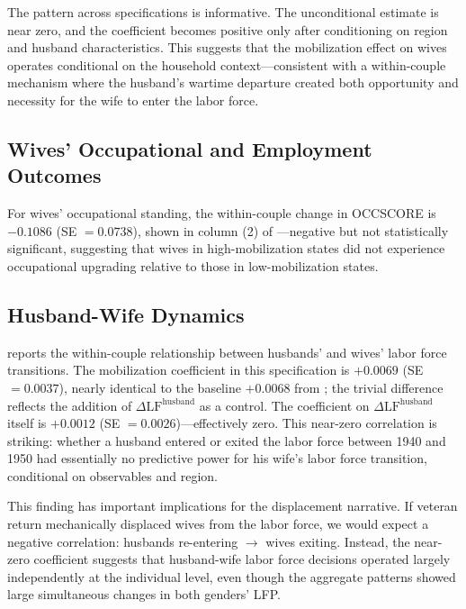 \documentclass[12pt]{article}
\begin{document}
The pattern across specifications is informative. The unconditional estimate is near zero, and the coefficient becomes positive only after conditioning on region and husband characteristics. This suggests that the mobilization effect on wives operates conditional on the household context---consistent with a within-couple mechanism where the husband's wartime departure created both opportunity and necessity for the wife to enter the labor force.



\subsection{Wives' Occupational and Employment Outcomes}

For wives' occupational standing, the within-couple change in OCCSCORE is $-0.1086$ (SE $= 0.0738$), shown in column (2) of ---negative but not statistically significant, suggesting that wives in high-mobilization states did not experience occupational upgrading relative to those in low-mobilization states.

\subsection{Husband-Wife Dynamics}

 reports the within-couple relationship between husbands' and wives' labor force transitions. The mobilization coefficient in this specification is $+0.0069$ (SE $= 0.0037$), nearly identical to the baseline $+0.0068$ from ; the trivial difference reflects the addition of $\Delta \text{LF}^{\text{husband}}$ as a control. The coefficient on $\Delta \text{LF}^{\text{husband}}$ itself is $+0.0012$ (SE $= 0.0026$)---effectively zero. This near-zero correlation is striking: whether a husband entered or exited the labor force between 1940 and 1950 had essentially no predictive power for his wife's labor force transition, conditional on observables and region.

This finding has important implications for the displacement narrative. If veteran return mechanically displaced wives from the labor force, we would expect a negative correlation: husbands re-entering $\to$ wives exiting. Instead, the near-zero coefficient suggests that husband-wife labor force decisions operated largely independently at the individual level, even though the aggregate patterns showed large simultaneous changes in both genders' LFP.
\end{document}

